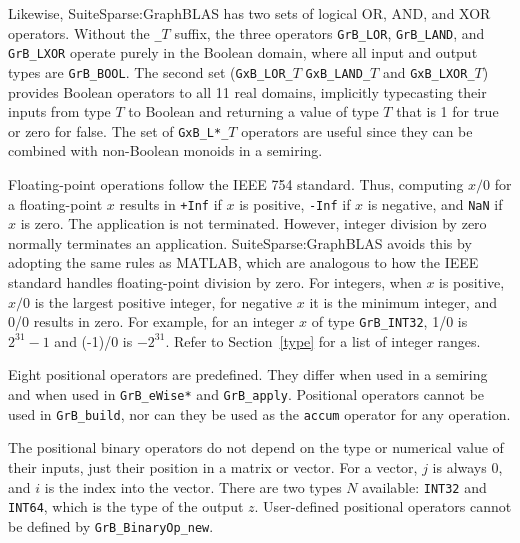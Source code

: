 \documentclass[12pt]{article}
\begin{document}
{Likewise, SuiteSparse:GraphBLAS has two sets of logical OR, AND, and XOR
operators.  Without the \verb'_'$T$ suffix, the three operators \verb'GrB_LOR',
\verb'GrB_LAND', and \verb'GrB_LXOR' operate purely in the Boolean domain,
where all input and output types are \verb'GrB_BOOL'.  The second set
(\verb'GxB_LOR_'$T$ \verb'GxB_LAND_'$T$ and \verb'GxB_LXOR_'$T$) provides
Boolean operators to all 11 real domains, implicitly typecasting their inputs from
type $T$ to Boolean and returning a value of type $T$ that is 1 for true or
zero for false.  The set of \verb'GxB_L*_'$T$ operators are useful since they
can be combined with non-Boolean monoids in a semiring.

Floating-point operations follow the IEEE 754 standard.  Thus, computing $x/0$
for a floating-point $x$ results in \verb'+Inf' if $x$ is positive, \verb'-Inf'
if $x$ is negative, and \verb'NaN' if $x$ is zero.  The application is not
terminated.  However, integer division by zero normally terminates an
application.  SuiteSparse:GraphBLAS avoids this by adopting the same rules as
MATLAB, which are analogous to how the IEEE standard handles floating-point
division by zero.  For integers, when $x$ is positive, $x/0$ is the largest
positive integer, for negative $x$ it is the minimum integer, and 0/0 results
in zero.  For example, for an integer $x$ of type \verb'GrB_INT32', 1/0 is
$2^{31}-1$ and (-1)/0 is $-2^{31}$.  Refer to Section~\ref{type} for a list of
integer ranges.

Eight positional operators are predefined.  They differ when used in a semiring
and when used in \verb'GrB_eWise*' and \verb'GrB_apply'.  Positional operators
cannot be used in \verb'GrB_build', nor can they be used as the \verb'accum'
operator for any operation.

The positional binary operators do not depend on the type or numerical value of
their inputs, just their position in a matrix or vector.  For a vector, $j$ is
always 0, and $i$ is the index into the vector.  There are two types $N$
available: \verb'INT32' and \verb'INT64', which is the type of the output $z$.
User-defined positional operators cannot be defined by \verb'GrB_BinaryOp_new'.

}
\end{document}
